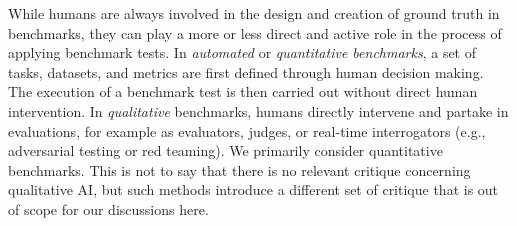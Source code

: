 While humans are always involved in the design and creation of ground truth in benchmarks, they can play a more or less direct and active role in the process of applying benchmark tests. In \textit{automated} or \textit{quantitative benchmarks}, a set of tasks, datasets, and metrics are first defined through human decision making. The execution of a benchmark test is then carried out without direct human intervention. In \textit{qualitative} benchmarks, humans directly intervene and partake in evaluations, for example as evaluators, judges, or real-time interrogators (e.g., adversarial testing or red teaming). We primarily consider quantitative benchmarks. This is not to say that there is no relevant critique concerning qualitative AI, but such methods introduce a different set of critique that is out of scope for our discussions here. 


